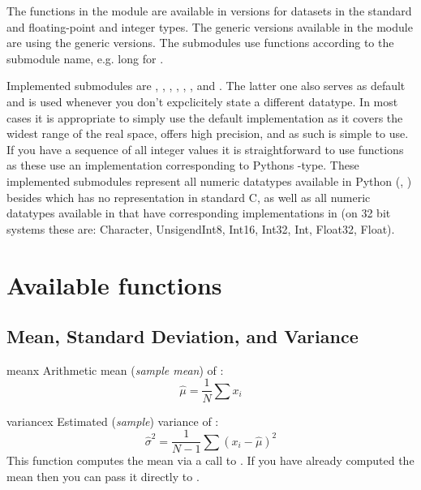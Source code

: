 The functions in the module are available in versions for datasets in the
standard and \numpy{} floating-point and integer types. The generic versions
available in the  module are using the generic \gsl{}
 versions.  The submodules use \gsl{} functions according to the
submodule name, e.g. long for .

Implemented submodules are , , ,
, , , and . The latter
one also serves as default and is used whenever you don't expclicitely state a
different datatype. In most cases it is appropriate to simply use the default
implementation as it covers the widest range of the real space, offers high
precision, and as such is simple to use. If you have a sequence of all integer
values it is straightforward to use  functions as
these use an implementation corresponding to Pythons -type. These
implemented submodules represent all numeric datatypes available in Python
(, ) besides  which has no
representation in standard C, as well as all numeric datatypes available in
\numpy{} that have corresponding implementations in \gsl{} (on 32 bit systems
these are: Character, UnsigendInt8, Int16, Int32, Int, Float32, Float).



\section{Available functions}
\label{sec:stat:available-functions}

\subsection{Mean, Standard Deviation, and Variance}
\label{sec:stat:mean-stddev-var}

\begin{funcdesc}{mean}{x}
   Arithmetic mean (\emph{sample mean}) of :
   \begin{equation}
      \hat\mu = \frac{1}{N} \sum x_i
   \end{equation}
\end{funcdesc}

\begin{funcdesc}{variance}{x}
   Estimated (\emph{sample}) variance of :
   \begin{equation}
      \hat\sigma^2 = \frac{1}{N-1} \sum (x_i - \hat\mu)^2
   \end{equation}
   This function computes the mean via a call to .  If you have
   already computed the mean then you can pass it directly to
   .
\end{funcdesc}

